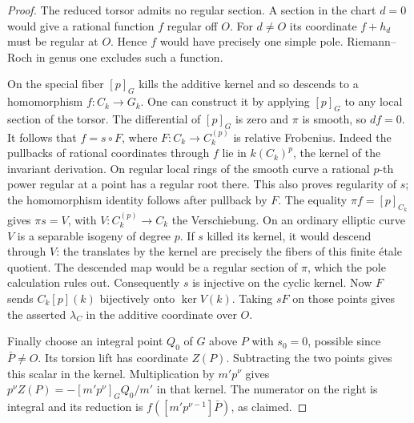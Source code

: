 \documentclass[a4paper,11pt]{article}
\theoremstyle{definition}
\theoremstyle{remark}
\numberwithin{equation}{section}
\begin{document}
\begin{proof}
The reduced torsor admits no regular section. A section in the
chart \(d=0\) would give a rational function \(f\) regular off
\(O\). For \(d\ne O\) its coordinate \(f+h_d\) must be regular
at \(O\). Hence \(f\) would have precisely one simple pole.
Riemann--Roch in genus one excludes such a function.

On the special fiber \([p]_G\) kills the additive kernel and so
descends to a homomorphism \(f:C_k\to G_k\). One can construct
it by applying \([p]_G\) to any local section of the torsor.
The differential of \([p]_G\) is zero and \(\pi\) is smooth,
so \(df=0\). It follows that \(f=s\circ F\), where \(F:C_k\to
C_k^{(p)}\) is relative Frobenius. Indeed the pullbacks of
rational coordinates through \(f\) lie in \(k(C_k)^p\), the
kernel of the invariant derivation. On regular local rings of
the smooth curve a rational \(p\)-th power regular at a point
has a regular root there. This also proves regularity of \(s\);
the homomorphism identity follows after pullback by \(F\).
The equality \(\pi f=[p]_{C_k}\) gives \(\pi s=V\), with
\(V:C_k^{(p)}\to C_k\) the Verschiebung. On an ordinary
elliptic curve \(V\) is a separable isogeny of degree \(p\).
If \(s\) killed its kernel, it would descend through \(V\):
the translates by the kernel are precisely the fibers of this
finite \'etale quotient. The descended map would be a regular
section of \(\pi\), which the pole calculation rules out.
Consequently \(s\) is injective on the cyclic kernel.
Now \(F\) sends \(C_k[p](k)\) bijectively onto \(\ker V(k)\).
Taking \(sF\) on those points gives the asserted \(\lambda_C\)
in the additive coordinate over \(O\).

Finally choose an integral point \(Q_0\) of \(G\) above \(P\)
with \(s_0=0\), possible since \(\bar P\ne O\).
Its torsion lift has coordinate \(Z(P)\). Subtracting the two
points gives this scalar in the kernel. Multiplication by
\(m'p^\nu\) gives
\(p^\nu Z(P)=-[m'p^\nu]_G Q_0/m'\) in that kernel.
The numerator on the right is integral and its reduction is
\(f([m'p^{\nu-1}]\bar P)\), as claimed.
\end{proof}
\end{document}
